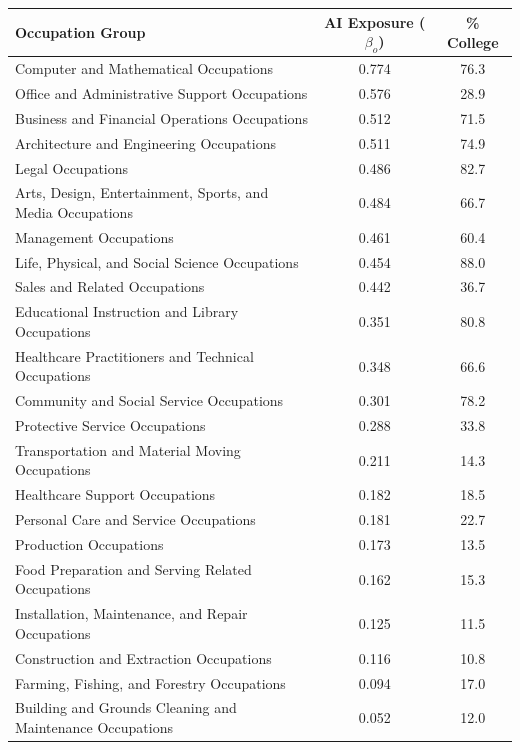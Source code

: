 \begin{small}
\begin{tabular}{lcc}
\hline
Occupation Group & AI Exposure ($\beta_o$) & \% College \\
\hline
Computer and Mathematical Occupations&0.774&76.3\\
Office and Administrative Support Occupations&0.576&28.9\\
Business and Financial Operations Occupations&0.512&71.5\\
Architecture and Engineering Occupations&0.511&74.9\\
Legal Occupations&0.486&82.7\\
Arts, Design, Entertainment, Sports, and Media Occupations&0.484&66.7\\
Management Occupations&0.461&60.4\\
Life, Physical, and Social Science Occupations&0.454&88.0\\
Sales and Related Occupations&0.442&36.7\\
Educational Instruction and Library Occupations&0.351&80.8\\
Healthcare Practitioners and Technical Occupations&0.348&66.6\\
Community and Social Service Occupations&0.301&78.2\\
Protective Service Occupations&0.288&33.8\\
Transportation and Material Moving Occupations&0.211&14.3\\
Healthcare Support Occupations&0.182&18.5\\
Personal Care and Service Occupations&0.181&22.7\\
Production Occupations&0.173&13.5\\
Food Preparation and Serving Related Occupations&0.162&15.3\\
Installation, Maintenance, and Repair Occupations&0.125&11.5\\
Construction and Extraction Occupations&0.116&10.8\\
Farming, Fishing, and Forestry Occupations&0.094&17.0\\
Building and Grounds Cleaning and Maintenance Occupations&0.052&12.0\\
\hline
\end{tabular}
\end{small}
